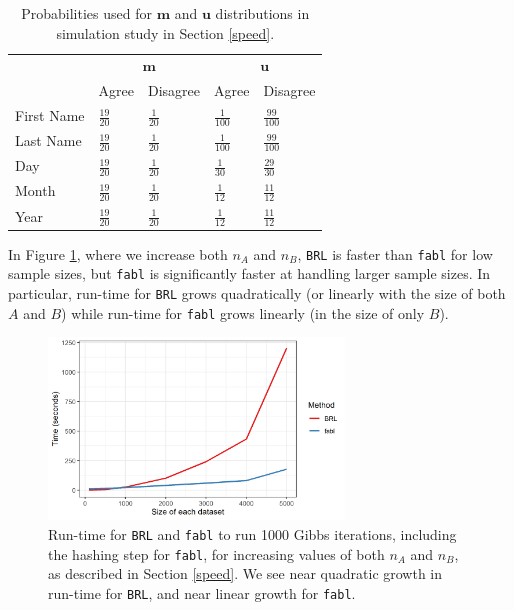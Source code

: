\documentclass[ba]{imsart}
\begin{document}
	
	\begin{table}[t]
		\centering
		\begin{tabular}{lll|ll}
			\multicolumn{1}{c}{ } & \multicolumn{2}{c}{$\bm{m}$} & \multicolumn{2}{c}{$\bm{u}$} \\
			\cline{2-3} \cline{4-5}
			& Agree & Disagree & Agree & Disagree \\
			\hline
			First Name & $\frac{19}{20}$ & $\frac{1}{20}$ & $\frac{1}{100}$ &  $\frac{99}{100}$ \\ 
			Last Name & $\frac{19}{20}$ & $\frac{1}{20}$ & $\frac{1}{100}$ &  $\frac{99}{100}$ \\ 
			Day & $\frac{19}{20}$ & $\frac{1}{20}$ & $\frac{1}{30}$ &  $\frac{29}{30}$ \\ 
			Month & $\frac{19}{20}$ & $\frac{1}{20}$ & $\frac{1}{12}$ &  $\frac{11}{12}$ \\ 
			Year & $\frac{19}{20}$ & $\frac{1}{20}$ & $\frac{1}{12}$ &  $\frac{11}{12}$ \\  
			\hline
		\end{tabular}
		\caption{Probabilities used for $\bm{m}$ and $\bm{u}$ distributions in simulation study in Section \ref{speed}.}\label{Tab:distributions}
	\end{table}
	
	In Figure \ref{fig:speed1}, where we increase both $n_A$ and $n_B$, \texttt{BRL} is faster than \texttt{fabl} for low sample sizes, but \texttt{fabl} is significantly faster at handling larger sample sizes. In particular, run-time for \texttt{BRL} grows quadratically (or linearly with the size of both $A$ and $B$) while run-time for \texttt{fabl} grows linearly (in the size of only $B$).
	
	\begin{figure}[t]
		\begin{center} \includegraphics[width=0.7\textwidth]{../notes/figures/sadinle_speed_plot2} 
			\caption{Run-time for \texttt{BRL} and \texttt{fabl} to run 1000 Gibbs iterations, including the hashing step for \texttt{fabl}, for increasing values of both $n_A$ and $n_B$, as described in Section \ref{speed}. We see near quadratic growth in run-time for \texttt{BRL}, and near linear growth for \texttt{fabl}.}\label{fig:speed1}
		\end{center}
	\end{figure}
	
\end{document}
